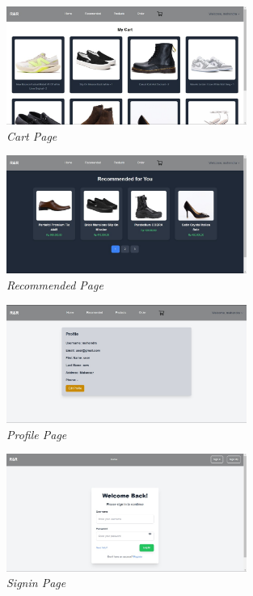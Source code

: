 \documentclass[journal,article,submit,pdftex,moreauthors]{Definitions/mdpi}
\begin{document}
\begin{figure}[H]
    \centering
    \includegraphics[width=0.7\textwidth]{images/cartPage.jpeg}
    \captionsetup{justification=centering}
    \caption{\textit{Cart Page}}
    \label{fig:activity-login}
\end{figure}
\begin{figure}[H]
    \centering
    \includegraphics[width=0.7\textwidth]{images/recommendedPage.jpeg}
    \captionsetup{justification=centering}
    \caption{\textit{Recommended Page}}
    \label{fig:activity-login}
\end{figure}
\begin{figure}[H]
    \centering
    \includegraphics[width=0.7\textwidth]{images/profilePage.jpeg}
    \captionsetup{justification=centering}
    \caption{\textit{Profile Page}}
    \label{fig:activity-login}
\end{figure}
\begin{figure}[H]
    \centering
    \includegraphics[width=0.7\textwidth]{images/signinPage.jpeg}
    \captionsetup{justification=centering}
    \caption{\textit{Signin Page}}
    \label{fig:activity-login}
\end{figure}
\end{document}
